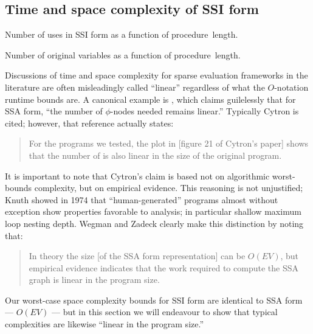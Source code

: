 \documentclass[12pt,titlepage,twoside]{article}
\begin{document}
\subsection{Time and space complexity of SSI form}\label{sec:ssi_complexity}
%
\begin{myfigure}%

\caption{Number of uses in SSI form as a function of
procedure~length.}
\label{fig:ussidata}
\end{myfigure}
\begin{myfigure}%

\caption{Number of original variables as a function of
procedure~length.}
\label{fig:v0data}
\end{myfigure}
Discussions of time and space complexity for sparse evaluation
frameworks in the literature are often misleadingly called ``linear''
regardless of what the $O$-notation runtime bounds are.  A canonical
example is \cite{sreedhar95:lintime}, which claims guilelessly that
for SSA form, ``the number of $\phi$-nodes needed remains linear.''
Typically Cytron \cite{cytron91:ssa} is cited; however, that reference
actually states:
\begin{quote}
For the programs we tested, the plot in [figure 21 of Cytron's paper]
shows that the number of  is also linear in the size of
the original program.
\end{quote}
It is important to note that Cytron's claim is based not on
algorithmic worst-bounds complexity, but on empirical evidence.  This
reasoning is not unjustified; Knuth \cite{knuth74:fortran} showed in
1974 that ``human-generated'' programs almost without exception show
properties favorable to analysis; in particular shallow maximum loop
nesting depth.  Wegman and Zadeck \cite{wegman91:scc} clearly make
this distinction by noting that:
\begin{quote}
In theory the size [of the SSA form representation] can be $O(EV)$,
but empirical evidence indicates that the work required to compute the
SSA graph is linear in the program size.
\end{quote}
Our worst-case space complexity bounds for SSI form are identical to
SSA form --- $O(EV)$ --- but in this section we will endeavour to show
that typical complexities are likewise ``linear in the program size.''
\end{document}
